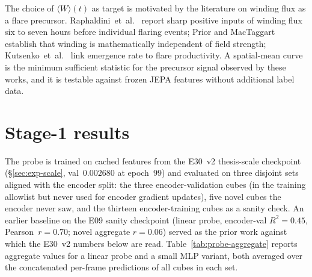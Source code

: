 The choice of $\langle W \rangle (t)$ as target is motivated by the
literature on winding flux as a flare precursor.
Raphaldini~et~al.~\cite{raphaldini2022winding} report sharp positive
inputs of winding flux six to seven hours before individual flaring
events; Prior and MacTaggart~\cite{prior2020helicity} establish that
winding is mathematically independent of field strength;
Kutsenko~et~al.~\cite{kutsenko2021flare} link emergence rate to flare
productivity. A spatial-mean curve is the minimum sufficient
statistic for the precursor signal observed by these works, and it
is testable against frozen JEPA features without additional label
data.

\section{Stage-1 results}
\label{sec:probe-stage1}

The probe is trained on cached features from the E30~v2
thesis-scale checkpoint (\S\ref{sec:exp-scale}, val~$0.002680$ at
epoch~99) and evaluated on three disjoint sets aligned with the
encoder split: the three encoder-validation cubes (in the
training allowlist but never used for encoder gradient updates),
five novel cubes the encoder never saw, and the thirteen
encoder-training cubes as a sanity check. An earlier baseline on
the E09 sanity checkpoint (linear probe, encoder-val
$R^{2} = 0.45$, Pearson~$r = 0.70$; novel aggregate $r = 0.06$)
served as the prior work against which the E30~v2 numbers below
are read.
Table~\ref{tab:probe-aggregate} reports aggregate values for a
linear probe and a small MLP variant, both averaged over the
concatenated per-frame predictions of all cubes in each set.

